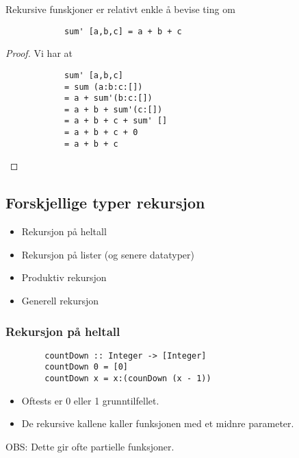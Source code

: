 \documentclass{article}
\begin{document}
    \begin{eg}
        Rekursive funskjoner er relativt enkle å bevise ting om

        \begin{lstlisting}
            sum' [a,b,c] = a + b + c
        \end{lstlisting}
    \end{eg}

    \begin{proof}
        Vi har at

        \begin{lstlisting}
            sum' [a,b,c]
            = sum (a:b:c:[])
            = a + sum'(b:c:[])
            = a + b + sum'(c:[])
            = a + b + c + sum' []
            = a + b + c + 0
            = a + b + c
        \end{lstlisting}
    \end{proof}

    \subsection{Forskjellige typer rekursjon}
    \begin{itemize}
        \item Rekursjon på heltall
        \item Rekursjon på lister (og senere datatyper)
        \item Produktiv rekursjon
        \item Generell rekursjon
    \end{itemize}

    \subsubsection{Rekursjon på heltall}

    \begin{lstlisting}
        countDown :: Integer -> [Integer]
        countDown 0 = [0]
        countDown x = x:(counDown (x - 1))
    \end{lstlisting}

     \begin{itemize}
         \item Oftests er 0 eller 1 grunntilfellet.
         \item De rekursive kallene kaller funksjonen med et midnre parameter.
     \end{itemize}

     OBS: Dette gir ofte partielle funksjoner.
\end{document}
